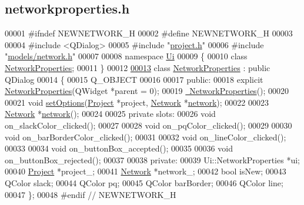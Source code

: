\hypertarget{networkproperties_8h_source}{}\subsection{networkproperties.\+h}
\label{networkproperties_8h_source}

\begin{DoxyCode}
00001 \textcolor{preprocessor}{#ifndef NEWNETWORK\_H}
00002 \textcolor{preprocessor}{#define NEWNETWORK\_H}
00003 
00004 \textcolor{preprocessor}{#include <QDialog>}
00005 \textcolor{preprocessor}{#include "\hyperlink{project_8h}{project.h}"}
00006 \textcolor{preprocessor}{#include "\hyperlink{network_8h}{models/network.h}"}
00007 
00008 \textcolor{keyword}{namespace }\hyperlink{namespace_ui}{Ui}
00009 \{
00010 \textcolor{keyword}{class }\hyperlink{class_network_properties}{NetworkProperties};
00011 \}
00012 
\hypertarget{networkproperties_8h_source_l00013}{}\hyperlink{class_network_properties}{00013} \textcolor{keyword}{class }\hyperlink{class_network_properties}{NetworkProperties} : \textcolor{keyword}{public} QDialog
00014 \{
00015   Q\_OBJECT
00016 
00017 \textcolor{keyword}{public}:
00018   \textcolor{keyword}{explicit} \hyperlink{class_network_properties_a3d9dac6454f6e722360d9d77af85e4ce}{NetworkProperties}(QWidget *parent = 0);
00019   \hyperlink{class_network_properties_a097b617788eebe80236c0041f8293422}{~NetworkProperties}();
00020 
00021   \textcolor{keywordtype}{void} \hyperlink{class_network_properties_a9dd17216f65e1c35012699e13547d984}{setOptions}(\hyperlink{class_project}{Project} *project, \hyperlink{class_network}{Network} *\hyperlink{class_network_properties_ac166b4624361fe4f3003bbe5553ad18b}{network});
00022   
00023   \hyperlink{class_network}{Network} *\hyperlink{class_network_properties_ac166b4624361fe4f3003bbe5553ad18b}{network}();
00024   
00025 \textcolor{keyword}{private} slots:
00026   \textcolor{keywordtype}{void} on\_slackColor\_clicked();
00027 
00028   \textcolor{keywordtype}{void} on\_pqColor\_clicked();
00029 
00030   \textcolor{keywordtype}{void} on\_barBorderColor\_clicked();
00031 
00032   \textcolor{keywordtype}{void} on\_lineColor\_clicked();
00033 
00034   \textcolor{keywordtype}{void} on\_buttonBox\_accepted();
00035   
00036   \textcolor{keywordtype}{void} on\_buttonBox\_rejected();
00037   
00038 \textcolor{keyword}{private}:
00039   Ui::NetworkProperties *ui;
00040   \hyperlink{class_project}{Project} *project\_;
00041   \hyperlink{class_network}{Network} *network\_;
00042   \textcolor{keywordtype}{bool} isNew;
00043   QColor slack;
00044   QColor pq;
00045   QColor barBorder;
00046   QColor line;
00047 \};
00048 \textcolor{preprocessor}{#endif // NEWNETWORK\_H}
\end{DoxyCode}

